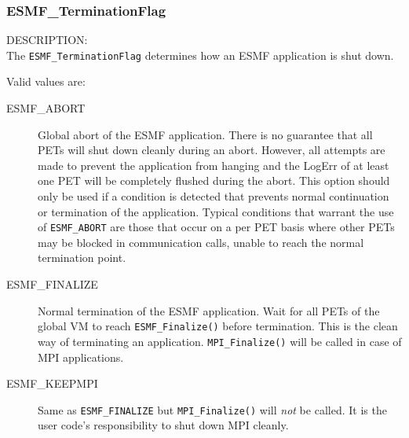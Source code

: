 
\subsubsection{ESMF\_TerminationFlag}
\label{app:terminationflag}

{\sf DESCRIPTION:\\}
The {\tt ESMF\_TerminationFlag} determines how an ESMF application is shut down.

Valid values are:
\begin{description}
   \item [ESMF\_ABORT] 
         Global abort of the ESMF application. There is no guarantee 
         that all PETs will shut down cleanly during an abort. However, all
         attempts are made to prevent the application from hanging and the
         LogErr of at least one PET will be completely flushed during the abort.
         This option should only be used if a condition is detected that
         prevents normal continuation or termination of the application.
         Typical conditions that warrant the use of {\tt ESMF\_ABORT} are those
         that occur on a per PET basis where other PETs may be blocked in 
         communication calls, unable to reach the normal termination point.
   \item [ESMF\_FINALIZE]
         Normal termination of the ESMF application. Wait for all PETs of the
         global VM to reach {\tt ESMF\_Finalize()} before termination. This is
         the clean way of terminating an application. {\tt MPI\_Finalize()} will
         be called in case of MPI applications.
   \item [ESMF\_KEEPMPI]
         Same as {\tt ESMF\_FINALIZE} but {\tt MPI\_Finalize()} will {\em not}
         be called. It is the user code's responsibility to shut down MPI
         cleanly.
\end{description}
